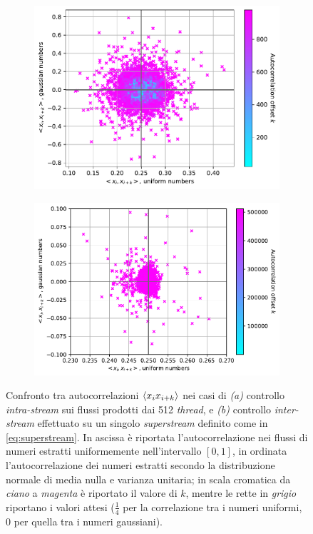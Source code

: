 \begin{figure}[t]
\centering
\begin{subfigure}{.5\textwidth}
  \centering
  \includegraphics[scale=0.5]{graphs/CorrelationTests_IntraStreamCorrelations.pdf}
  \caption{}
  \label{fig:intra_corr}
\end{subfigure}%
\begin{subfigure}{.5\textwidth}
  \centering
  \includegraphics[scale=0.5]{graphs/CorrelationTests_InterStreamCorrelations.pdf}
  \caption{}
  \label{fig:inter_corr}
\end{subfigure}
\caption[Confronto tra autocorrelazioni nel caso \textit{intra-stream} e \textit{inter-stream}.]{Confronto tra autocorrelazioni $\braket{x_i x_{i+k}}$ nei casi di \textit{(a)} controllo \textit{intra-stream} sui flussi prodotti dai 512 \textit{thread}, e \textit{(b)} controllo \textit{inter-stream} effettuato su un singolo \textit{superstream} definito come in \eqref{eq:superstream}. In ascissa è riportata l'autocorrelazione nei flussi di numeri estratti uniformemente nell'intervallo $[0,1]$, in ordinata l'autocorrelazione dei numeri estratti secondo la distribuzione normale di media nulla e varianza unitaria; in scala cromatica da \textit{ciano} a \textit{magenta} è riportato il valore di $k$, mentre le rette in \textit{grigio} riportano i valori attesi ($\frac{1}{4}$ per la correlazione tra i numeri uniformi, $0$ per quella tra i numeri gaussiani).}
\end{figure}

